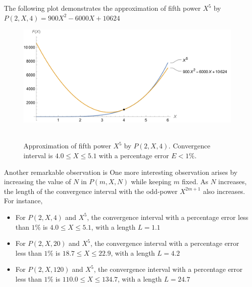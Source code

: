 The following plot demonstrates the approximation of fifth power $X^5$ by
$P(2,X,4) = 900X^2 - 6000X + 10624$
\begin{figure}[H]
    \centering
    \includegraphics[width=1\textwidth]{sections/images/03_plots_polynomial_p2_n4_with_fifth}
    ~\caption{Approximation of fifth power $X^5$ by $P(2, X, 4)$.
    Convergence interval is $4.0 \leq X \leq 5.1$ with a percentage error $E < 1\%$.
    }\label{fig:03_plots_polynomial_p2_n4_with_fifth}
\end{figure}
Another remarkable observation is
One more interesting observation arises by increasing the value of $N$ in $P(m, X, N)$ while keeping $m$ fixed.
As $N$ increases, the length of the convergence interval with the odd-power $X^{2m+1}$ also increases.
For instance,
\begin{itemize}
    \item For $P(2, X, 4)$ and $X^5$, the convergence interval with a percentage error less than $1\%$ is $4.0 \leq X \leq 5.1$, with a length $L=1.1$
    \item For $P(2, X, 20)$ and $X^5$, the convergence interval with a percentage error less than $1\%$ is $18.7 \leq X \leq 22.9$, with a length $L=4.2$
    \item For $P(2, X, 120)$ and $X^5$, the convergence interval with a percentage error less than $1\%$ is $110.0 \leq X \leq 134.7$, with a length $L=24.7$
\end{itemize}
